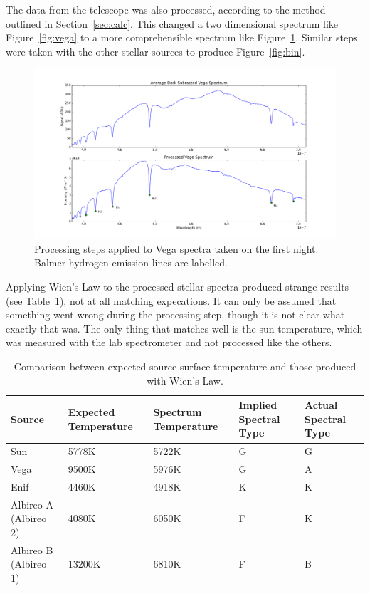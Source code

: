 \documentclass[a4paper,12pt]{article}
\begin{document}
The data from the telescope was also processed, according to the method outlined in Section~\ref{sec:calc}. This changed a two dimensional spectrum like Figure~\ref{fig:vega} to a more comprehensible spectrum like Figure~\ref{fig:processed}. Similar steps were taken with the other stellar sources to produce Figure~\ref{fig:bin}.

\begin{figure}[!htbp]
\centering
\includegraphics[scale = 0.35]{processed_vega.png}
\caption{Processing steps applied to Vega spectra taken on the first night. Balmer hydrogen emission lines are labelled.}
\label{fig:processed}
\end{figure}
Applying Wien’s Law to the processed stellar spectra produced strange results (see Table~\ref{tab:sources}), not at all matching expecations. It can only be assumed that something went wrong during the processing step, though it is not clear what exactly that was. The only thing that matches well is the sun temperature, which was measured with the lab spectrometer and not processed like the others.
\begin{table}[!htbp]
  \centering
  \begin{tabular}{p{1in}||p{1in}||p{1in}||p{1in}||p{1in}}
    Source & Expected Temperature & Spectrum Temperature & Implied Spectral Type & Actual Spectral Type\\
    \hline
    Sun & 5778K  & 5722K & G & G\\
    \hline
    Vega & 9500K \citep{vega} & 5976K & G & A\\
    \hline
    Enif & 4460K \citep{enif} & 4918K & K & K\\
    \hline
    Albireo A (Albireo 2) & 4080K \citep{albireo} & 6050K & F & K\\
    \hline
    Albireo B (Albireo 1) & 13200K \citep{albireo} & 6810K & F & B\\
    \end{tabular}
    \caption{Comparison between expected source surface temperature and those produced with Wien's Law.}
    \label{tab:sources}
\end{table}
\end{document}
